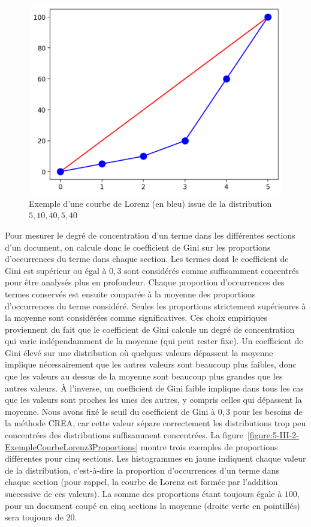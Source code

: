 \medskip

\begin{figure}[ht!]
\centering
\includegraphics[scale=0.6]{5-Conclusion/images/3-analyse-temporelle/exemple_courbe_lorenz_simple.png}
\caption{Exemple d'une courbe de Lorenz (en bleu) issue de la distribution $ 5, 10, 40, 5, 40 $ }
\label{figure:5-III-2-ExempleCourbeLorenz}
\end{figure}



Pour mesurer le degré de concentration d'un terme dans les différentes sections d'un document, on calcule donc le coefficient de Gini sur les proportions d'occurrences du terme dans chaque section.
Les termes dont le coefficient de Gini est supérieur ou égal à $ 0,3 $ sont considérés comme suffisamment concentrés pour être analysés plus en profondeur.
Chaque proportion d'occurrences des termes conservés est ensuite comparée à la moyenne des proportions d'occurrences du terme considéré.
Seules les proportions strictement supérieures à la moyenne sont considérées comme significatives.
Ces choix empiriques proviennent du fait que le coefficient de Gini calcule un degré de concentration qui varie indépendamment de la moyenne (qui peut rester fixe).
Un coefficient de Gini élevé sur une distribution où quelques valeurs dépassent la moyenne implique nécessairement que les autres valeurs sont beaucoup plus faibles, donc que les valeurs au dessus de la moyenne sont beaucoup plus grandes que les autres valeurs.
À l'inverse, un coefficient de Gini faible implique dans tous les cas que les valeurs sont proches les unes des autres, y compris celles qui dépassent la moyenne.
Nous avons fixé le seuil du coefficient de Gini à $ 0,3 $ pour les besoins de la méthode CREA, car cette valeur sépare correctement les distributions trop peu concentrées des distributions suffisamment concentrées.
La figure~\ref{figure:5-III-2-ExempleCourbeLorenz3Proportions} montre trois exemples de proportions différentes pour cinq sections.
Les histogrammes en jaune indiquent chaque valeur de la distribution, c'est-à-dire la proportion d'occurrences d'un terme dans chaque section (pour rappel, la courbe de Lorenz est formée par l'addition successive de ces valeurs).
La somme des proportions étant toujours égale à $ 100 $, pour un document coupé en cinq sections la moyenne (droite verte en pointillés) sera toujours de $ 20 $.

